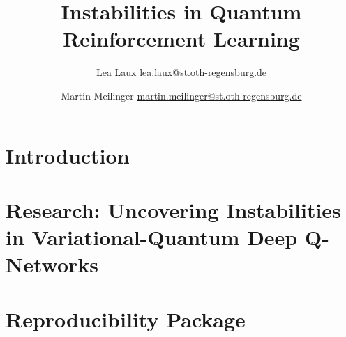 \documentclass[conference, 10pt]{IEEEtran}
\title{Instabilities in Quantum Reinforcement Learning}
\author{Lea Laux \href{mailto:lea.laux@st.oth-regensburg.de}{lea.laux@st.oth-regensburg.de}  \and 
 Martin Meilinger \href{mailto:martin.meilinger@st.oth-regensburg.de}{martin.meilinger@st.oth-regensburg.de}}
\begin{document}
\begin{acronym}
\end{acronym}

\maketitle

\section{Introduction}


\section{Research: Uncovering Instabilities in Variational-Quantum Deep Q-Networks}



\section{Reproducibility Package}


\printbibliography
\end{document}

